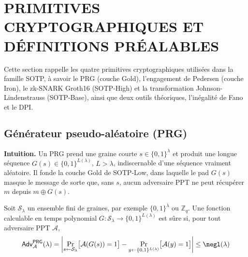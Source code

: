 \section{PRIMITIVES CRYPTOGRAPHIQUES ET D\'EFINITIONS PR\'EALABLES}
\label{sec:gamebased_primitives}
\begin{sloppypar}

Cette section rappelle les quatre primitives cryptographiques utilis\'ees dans la
famille SOTP, \`a savoir le PRG (couche Gold), l'engagement de Pedersen (couche Iron),
le zk-SNARK Groth16 (SOTP-High) et la transformation Johnson-Lindenstrauss
(SOTP-Base), ainsi que deux outils th\'eoriques, l'in\'egalit\'e de Fano et le DPI.

\subsection{G\'en\'erateur pseudo-al\'eatoire (PRG)}
\noindent\textbf{Intuition.} Un PRG prend une graine courte
$s \in \{0,1\}^\lambda$ et produit une longue s\'equence
$G(s) \in \{0,1\}^{L(\lambda)}$, $L > \lambda$, indiscernable
d'une s\'equence vraiment al\'eatoire. Il fonde la couche
Gold de SOTP-Low, dans laquelle le pad $G(s)$ masque le message de sorte que, sans $s$,
aucun adversaire PPT ne peut r\'ecup\'erer $m$ depuis $m \oplus G(s)$.

\begin{definition}\label{def:ann_prg}
Soit $\mathcal{S}_\lambda$ un ensemble fini de graines, par exemple
$\{0,1\}^\lambda$ ou $\mathbb{Z}_q$.
Une fonction calculable en temps polynomial
$G\colon \mathcal{S}_\lambda \to \{0,1\}^{L(\lambda)}$
est sûre si, pour tout adversaire PPT $\mathcal{A}$, 
\begin{equation}
\mathsf{Adv}^{\mathsf{PRG}}_{\mathcal{A}}(\lambda) =
\left|
\Pr_{s \leftarrow \mathcal{S}_\lambda}\!\big[\mathcal{A}(G(s)) = 1\big]
- \Pr_{y \leftarrow \{0,1\}^{L(\lambda)}}\!\big[\mathcal{A}(y) = 1\big]
\right| \leq \negl(\lambda)
\end{equation}
\end{definition}


\end{sloppypar}
